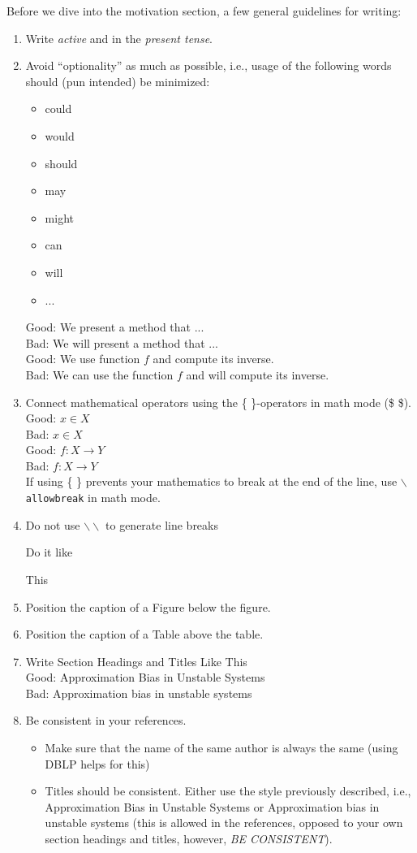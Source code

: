Before we dive into the motivation section, a few general guidelines for writing:
\begin{enumerate}
	\item Write \emph{active} and in the \emph{present tense}.
	\item Avoid \enquote{optionality} as much as possible, i.e., usage of the following words should (pun intended) be minimized:
	\begin{itemize}
		\item could
		\item would
		\item should
		\item may
		\item might
		\item can
		\item will
		\item ...
	\end{itemize}
	Good: We present a method that ...\\
	Bad: We will present a method that ...\\
	Good: We use function $f$ and compute its inverse.\\
	Bad: We can use the function $f$ and will compute its inverse.\\
	\item Connect mathematical operators using the \{ \}-operators in math mode (\$ \$).\\
	Good: $x{\in}X$\\
	Bad: $x \in X$\\
	Good: $f{\colon}X{\to}Y$\\
	Bad: $f \colon X \to Y$\\
	If using \{ \} prevents your mathematics to break at the end of the line, use \texttt{$\backslash$allowbreak} in math mode.
	\item Do not use $\backslash\backslash$ to generate line breaks %
	
	Do it like

	This
	\item Position the caption of a Figure below the figure.
	\item Position the caption of a Table above the table.
	\item Write Section Headings and Titles Like This\\
	Good: Approximation Bias in Unstable Systems\\
	Bad: Approximation bias in unstable systems\\
	\item Be consistent in your references.
	\begin{itemize}
		\item Make sure that the name of the same author is always the same (using DBLP helps for this)
		\item Titles should be consistent. Either use the style previously described, i.e., Approximation Bias in Unstable Systems or Approximation bias in unstable systems (this is allowed in the references, opposed to your own section headings and titles, however, \emph{BE CONSISTENT}).
	\end{itemize}
\end{enumerate}

